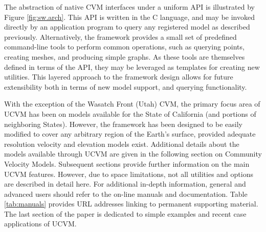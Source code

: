 The abstraction of native CVM interfaces under a uniform API is illustrated by Figure \ref{fig:sw.arch}. This API is written in the C language, and may be invoked directly by an application program to query any registered model as described previously. Alternatively, the framework provides a small set of predefined command-line tools to perform common operations, such as querying points, creating meshes, and producing simple graphs. As these tools are themselves defined in terms of the API, they may be leveraged as templates for creating new utilities. This layered approach to the framework design allows for future extensibility both in terms of new model support, and querying functionality.

With the exception of the Wasatch Front (Utah) CVM, the primary focus area of UCVM has been on models available for the State of California (and portions of neighboring States). However, the framework has been designed to be easily modified to cover any arbitrary region of the Earth's surface, provided adequate resolution velocity and elevation models exist. Additional details about the models available through UCVM are given in the following section on Community Velocity Models. Subsequent sections provide further information on the main UCVM features. However, due to space limitations, not all utilities and options are described in detail here. For additional in-depth information, general and advanced users should refer to the on-line manuals and documentation. Table \ref{tab:manuals} provides URL addresses linking to permanent supporting material. The last section of the paper is dedicated to simple examples and recent case applications of UCVM. 

